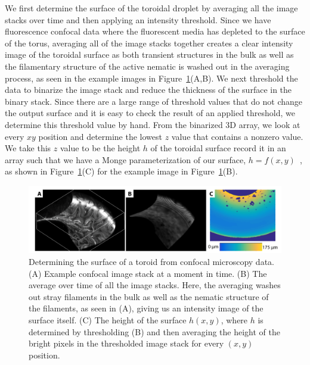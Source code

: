 We first determine the surface of the toroidal droplet by averaging all the image stacks over time and then applying an intensity threshold.
Since we have fluorescence confocal data where the fluorescent media has depleted to the surface of the torus, averaging all of the image stacks together creates a clear intensity image of the toroidal surface as both transient structures in the bulk as well as the filamentary structure of the active nematic is washed out in the averaging process, as seen in the example images in Figure~\ref{f:3-SurfaceHeight}(A,B).
We next threshold the data to binarize the image stack and reduce the thickness of the surface in the binary stack.
Since there are a large range of threshold values that do not change the output surface and it is easy to check the result of an applied threshold, we determine this threshold value by hand.
From the binarized 3D array, we look at every $xy$ position and determine the lowest $z$ value that contains a nonzero value.
We take this $z$ value to be the height $h$ of the toroidal surface record it in an array such that we have a Monge parameterization of our surface, $h = f(x,y)$~\cite{RN23}, as shown in Figure~\ref{f:3-SurfaceHeight}(C) for the example image in Figure~\ref{f:3-SurfaceHeight}(B).
\begin{figure}
  \centering
  \includegraphics{figures/C3/Ch3-Figs_SurfaceHeight.png}
  \caption{Determining the surface of a toroid from confocal microscopy data.
  (A) Example confocal image stack at a moment in time.
  (B) The average over time of all the image stacks.
  Here, the averaging washes out stray filaments in the bulk as well as the nematic structure of the filaments, as seen in (A), giving us an intensity image of the surface itself.
  (C) The height of the surface $h(x,y)$, where $h$ is determined by thresholding (B) and then averaging the height of the bright pixels in the thresholded image stack for every $(x,y)$ position.}\label{f:3-SurfaceHeight}
\end{figure}

